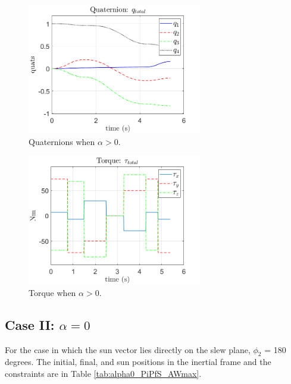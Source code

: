 \documentclass[letterpaper, preprint, paper,11pt]{AAS}	%
\begin{document}
	\begin{multicols}{2}
		\begin{figure}[H]
			\begin{center}
			\includegraphics[width=3in]{figures/alphaNot0/quats_phi_total.png}
			\caption{Quaternions when $\alpha>0$.}
			\label{fig:quats_phi_total}
			\end{center}
		\end{figure}
	\columnbreak
		\begin{figure}[H]
			\begin{center}
			\includegraphics[width=3in]{figures/alphaNot0/torque_total.png}
			\end{center}
			\caption{Torque when $\alpha>0$.}
			\label{fig:torque_total}
		\end{figure}
	\end{multicols}
			
\subsection{Case II: $\alpha = 0$} 
			
For the case in which the sun vector lies directly on the slew plane, $\phi_2$ = 180 degrees. The initial, final, and sun positions in the inertial frame and the constraints are in Table \ref{tab:alpha0_PiPfS_AWmax}. 
			
\end{document}
